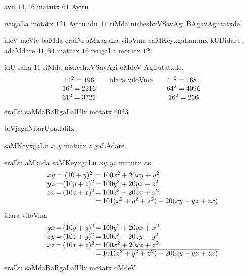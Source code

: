 avu $14,46$ matutx $61$ Ayitu
 
ivugaLa motatx $121$ Ayitu idu $11$ riMda nisheshxVSavAgi BAgavAgutatxde.

ideV meVle baMda eraDu aMkagaLa viloVma saMKeyxgaLanunx kUDidarU. adaMdare $41,64$ matutx $16$ ivugaLa motatx $121$

idU saha $11$ riMda nisheshxVSavAgi oMdeV Agirutatxde.
$$
\begin{array}[t]{c}
14^2=196\\
16^2=2216\\
61^2 = 3721
\end{array}
\hspace{0.5cm}
\text{idara viloVma}
\hspace{0.5cm}
\begin{array}[t]{c}
41^2 =1681\\
64^2 =4096\\
16^2 = 256
\end{array}
$$
eraDu saMdaBaRgaLalUlx motatx $6033$

\noindent biVjagaNitarUpadalilx 

saMKeyxgaLu $x,y$ matutx $z$ gaLAdare.

eraDu aMkada saMKeyxgaLu $xy,yz$ matutx $zx$
$$
\begin{array}[c]{c@{\,}c@{\,}c@{\,}c@{\,}l@{\,}}
xy &=&(10+y)^2  &=& 100x^2+20xy+y^2\\
yz &=&(10y+z)^2 &=& 100y^2+20yz+z^2\\
zx &=&(10z+x)^2 &=& 100z^2+20zx+x^2\\
   & &          &=& 101(x^2+y^2+z^2)+20(xy+yz+zx)
\end{array}
$$
idara viloVma
$$
\begin{array}[c]{c@{\,}c@{\,}c@{\,}c@{\,}l@{\,}}
yx &=&(10y+y)^2  &=& 100y^2+20yx+x^2\\
zy &=&(10z+y)^2  &=& 100z^2+20zy+y^2\\
xz &=&(10x+z)^2  &=& 100x^2+20xz+z^2\\\cline{4-5}
   & &           &=& 101(x^2+y^2+z^2)+20(xy+yz+zx)
\end{array}
$$
eraDu saMdaBaRgaLalUlx motatx oMdeV
